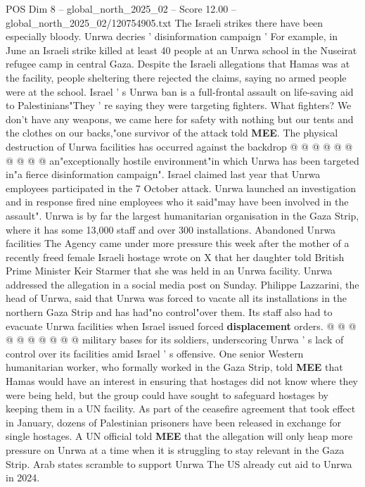 \begin{textsample}{POS Dim 8 – global\_north\_2025\_02 – Score 12.00 – global\_north\_2025\_02/120754905.txt}
The Israeli strikes there have been especially bloody.
Unrwa decries ' disinformation campaign ' For example, in June an Israeli strike killed at least 40 people at an Unrwa school in the Nuseirat refugee camp in central Gaza.
Despite the Israeli allegations that Hamas was at the facility, people sheltering there rejected the claims, saying no armed people were at the school.
Israel ' s Unrwa ban is a full-frontal assault on life-saving aid to Palestinians"They ' re saying they were targeting fighters.
What fighters?
We don't have any weapons, we came here for safety with nothing but our tents and the clothes on our backs,"one survivor of the attack told \textbf{MEE}.
The physical destruction of Unrwa facilities has occurred against the backdrop @ @ @ @ @ @ @ @ @ @ an"exceptionally hostile environment"in which Unrwa has been targeted in"a fierce disinformation campaign".
Israel claimed last year that Unrwa employees participated in the 7 October attack.
Unrwa launched an investigation and in response fired nine employees who it said"may have been involved in the assault".
Unrwa is by far the largest humanitarian organisation in the Gaza Strip, where it has some 13,000 staff and over 300 installations.
Abandoned Unrwa facilities The Agency came under more pressure this week after the mother of a recently freed female Israeli hostage wrote on X that her daughter told British Prime Minister Keir Starmer that she was held in an Unrwa facility.
Unrwa addressed the allegation in a social media post on Sunday.
Philippe Lazzarini, the head of Unrwa, said that Unrwa was forced to vacate all its installations in the northern Gaza Strip and has had"no control"over them.
Its staff also had to evacuate Unrwa facilities when Israel issued forced \textbf{displacement} orders. @ @ @ @ @ @ @ @ @ @ military bases for its soldiers, underscoring Unrwa ' s lack of control over its facilities amid Israel ' s offensive.
One senior Western humanitarian worker, who formally worked in the Gaza Strip, told \textbf{MEE} that Hamas would have an interest in ensuring that hostages did not know where they were being held, but the group could have sought to safeguard hostages by keeping them in a UN facility.
As part of the ceasefire agreement that took effect in January, dozens of Palestinian prisoners have been released in exchange for single hostages.
A UN official told \textbf{MEE} that the allegation will only heap more pressure on Unrwa at a time when it is struggling to stay relevant in the Gaza Strip.
Arab states scramble to support Unrwa The US already cut aid to Unrwa in 2024.

\end{textsample}
